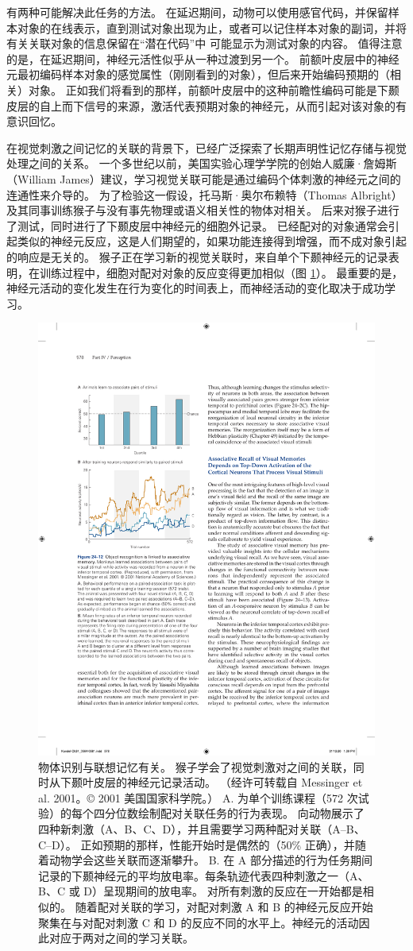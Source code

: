 有两种可能解决此任务的方法。
在延迟期间，动物可以使用感官代码，并保留样本对象的在线表示，直到测试对象出现为止，或者可以记住样本对象的副词，并将有关关联对象的信息保留在“潜在代码”中 可能显示为测试对象的内容。
值得注意的是，在延迟期间，神经元活性似乎从一种过渡到另一个。
前额叶皮层中的神经元最初编码样本对象的感觉属性（刚刚看到的对象），但后来开始编码预期的（相关）对象。 
正如我们将看到的那样，前额叶皮层中的这种前瞻性编码可能是下颞皮层的自上而下信号的来源，激活代表预期对象的神经元，从而引起对该对象的有意识回忆。


在视觉刺激之间记忆的关联的背景下，已经广泛探索了长期声明性记忆存储与视觉处理之间的关系。
一个多世纪以前，美国实验心理学学院的创始人威廉·詹姆斯（William James）建议，学习视觉关联可能是通过编码个体刺激的神经元之间的连通性来介导的。 为了检验这一假设，托马斯·奥尔布赖特（Thomas Albright）及其同事训练猴子与没有事先物理或语义相关性的物体对相关。
后来对猴子进行了测试，同时进行了下颞皮层中神经元的细胞外记录。
已经配对的对象通常会引起类似的神经元反应，这是人们期望的，如果功能连接得到增强，而不成对象引起的响应是无关的。 
猴子正在学习新的视觉关联时，来自单个下颞神经元的记录表明，在训练过程中，细胞对配对对象的反应变得更加相似（图 \ref{fig:24_12}）。 
最重要的是，神经元活动的变化发生在行为变化的时间表上，而神经活动的变化取决于成功学习。


\begin{figure}[htbp]
	\centering
	\includegraphics[width=0.5\linewidth]{chap24/fig_24_12}
	\caption{物体识别与联想记忆有关。 猴子学会了视觉刺激对之间的关联，同时从下颞叶皮层的神经元记录活动。 （经许可转载自 Messinger et al. 2001。© 2001 美国国家科学院。） A. 为单个训练课程（572 次试验）的每个四分位数绘制配对关联任务的行为表现。 向动物展示了四种新刺激（A、B、C、D），并且需要学习两种配对关联（A–B、C–D）。 正如预期的那样，性能开始时是偶然的（50\% 正确），并随着动物学会这些关联而逐渐攀升。 B. 在 A 部分描述的行为任务期间记录的下颞神经元的平均放电率。每条轨迹代表四种刺激之一（A、B、C 或 D）呈现期间的放电率。 对所有刺激的反应在一开始都是相似的。 随着配对关联的学习，对配对刺激 A 和 B 的神经元反应开始聚集在与对配对刺激 C 和 D 的反应不同的水平上。神经元的活动因此对应于两对之间的学习关联。}
	\label{fig:24_12}
\end{figure}


